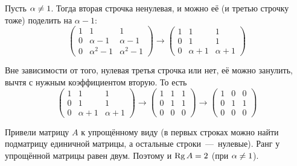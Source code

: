 \documentclass[a4paper,12pt]{article}
\begin{document}
\begin{solution}
    Пусть $\alpha \hm{\not=} 1$.
    Тогда вторая строчка ненулевая, и можно её (и третью строчку тоже) поделить на $\alpha - 1$:
    \[
      \begin{pmatrix}
        1 & 1 & 1\\
        0 & \alpha - 1 & \alpha - 1\\
        0 & \alpha^2 - 1 & \alpha^2 - 1
      \end{pmatrix}
      \longrightarrow
      \begin{pmatrix}
        1 & 1 & 1\\
        0 & 1 & 1\\
        0 & \alpha + 1 & \alpha + 1
      \end{pmatrix}
    \]
    
    Вне зависимости от того, нулевая третья строчка или нет, её можно занулить, вычтя с нужным коэффициентом вторую.
    То есть
    \[
      \begin{pmatrix}
        1 & 1 & 1\\
        0 & 1 & 1\\
        0 & \alpha + 1 & \alpha + 1
      \end{pmatrix}
      \longrightarrow
      \begin{pmatrix}
        1 & 1 & 1\\
        0 & 1 & 1\\
        0 & 0 & 0
      \end{pmatrix}
      \longrightarrow
      \begin{pmatrix}
        1 & 0 & 0\\
        0 & 1 & 1\\
        0 & 0 & 0
      \end{pmatrix}
    \]
    
    Привели матрицу $A$ к упрощённому виду (в первых строках можно найти подматрицу единичной матрицы, а остальные строки~---~нулевые).
    Ранг у упрощённой матрицы равен двум.
    Поэтому и $\Rg A \hm= 2$ (при $\alpha \hm{\not=} 1$).
  \end{solution}
\end{document}
